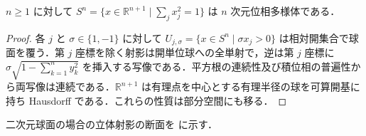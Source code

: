 \begin{example}[球面の座標近傍]
$n\geq1$ に対して $S^n=\{x\in\mathbb R^{n+1}\mid\sum_jx_j^2=1\}$ は $n$ 次元位相多様体である．
\end{example}
\begin{proof}
各 $j$ と $\sigma\in\{1,-1\}$ に対して $U_{j,\sigma}=\{x\in S^n\mid\sigma x_j>0\}$ は相対開集合で球面を覆う．第 $j$ 座標を除く射影は開単位球への全単射で，逆は第 $j$ 座標に $\sigma\sqrt{1-\sum_{k=1}^n y_k^2}$ を挿入する写像である．平方根の連続性及び積位相の普遍性から両写像は連続である．$\mathbb R^{n+1}$ は有理点を中心とする有理半径の球を可算開基に持ち Hausdorff である．これらの性質は部分空間にも移る．
\end{proof}
二次元球面の場合の立体射影の断面を  に示す．
